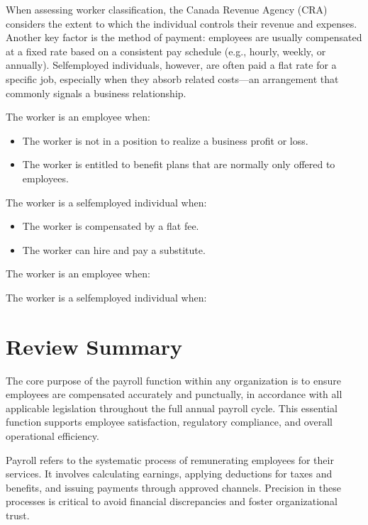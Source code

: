 \documentclass[letterpaper,10pt,english]{sphinxmanual}
\begin{document}
\sphinxAtStartPar
When assessing worker classification, the Canada Revenue Agency (CRA) considers the extent to which the individual controls
their revenue and expenses. Another key factor is the method of payment: employees are usually compensated at a fixed rate
based on a consistent pay schedule (e.g., hourly, weekly, or annually). Self\sphinxhyphen{}employed individuals, however, are often paid a
flat rate for a specific job, especially when they absorb related costs—an arrangement that commonly signals a business
relationship.

\sphinxAtStartPar
The worker is an employee when:
\begin{itemize}
\item {} 
\sphinxAtStartPar
The worker is not in a position to realize a business profit or loss.

\item {} 
\sphinxAtStartPar
The worker is entitled to benefit plans that are normally only offered to employees.

\end{itemize}

\sphinxAtStartPar
The worker is a self\sphinxhyphen{}employed individual when:
\begin{itemize}
\item {} 
\sphinxAtStartPar
The worker is compensated by a flat fee.

\item {} 
\sphinxAtStartPar
The worker can hire and pay a substitute.

\end{itemize}

\sphinxAtStartPar
The worker is an employee when:

\sphinxAtStartPar
The worker is a self\sphinxhyphen{}employed individual when:


\section{Review Summary}
\label{\detokenize{compliance:review-summary}}
\sphinxAtStartPar
The core purpose of the payroll function within any organization is to ensure employees are compensated accurately and
punctually, in accordance with all applicable legislation throughout the full annual payroll cycle. This essential function
supports employee satisfaction, regulatory compliance, and overall operational efficiency.

\sphinxAtStartPar
Payroll refers to the systematic process of remunerating employees for their services. It involves calculating earnings,
applying deductions for taxes and benefits, and issuing payments through approved channels. Precision in these processes is
critical to avoid financial discrepancies and foster organizational trust.
\end{document}
